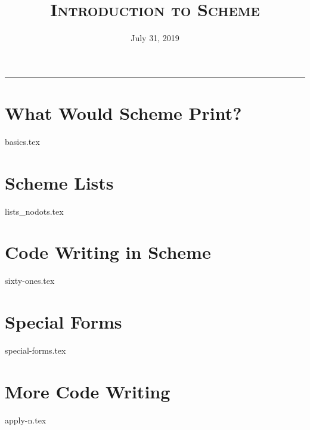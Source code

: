 \documentclass{exam}
\title{\textsc{Introduction to Scheme}}
\date{July 31, 2019}
\begin{document}
\maketitle
\rule{\textwidth}{0.15em}
\fontsize{12}{15}\selectfont

\begin{questions}
\section{What Would Scheme Print?}
{basics.tex}

\newpage
\section{Scheme Lists}
{lists_nodots.tex}


\newpage
\section{Code Writing in Scheme}
{sixty-ones.tex}


\newpage
\section{Special Forms}
{special-forms.tex}

\newpage
\section{More Code Writing}
{apply-n.tex}

\end{questions}
\end{document}
